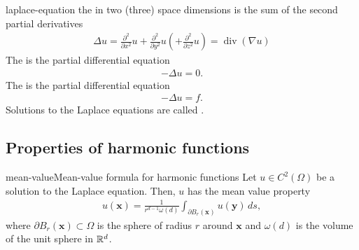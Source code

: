 \begin{Definition}{laplace-equation}
  the  in two (three) space dimensions is the sum of
  the second partial derivatives
  \begin{gather}
    \label{eq:fd:10}
    \Delta u = \frac{\partial^2}{\partial x^2}u
    + \frac{\partial^2}{\partial y^2}u
    \left(+ \frac{\partial^2}{\partial z^2}u\right)
    = \operatorname{div}(\nabla u)
  \end{gather}
  The  is the partial differential equation
  \begin{gather}
    \label{eq:fd:11}
    -\Delta u = 0.
  \end{gather}
  The  is the partial differential equation
  \begin{gather}
    \label{eq:fd:9}
    -\Delta u = f.
  \end{gather}
  Solutions to the Laplace equations are called .
\end{Definition}

\subsection{Properties of harmonic functions}

\begin{Theorem*}{mean-value}{Mean-value formula for harmonic functions}
  Let $u\in C^2(\Omega)$ be a solution to the Laplace equation. Then,
  $u$ has the mean value property
  \begin{gather}
    \label{eq:mean-value:1}
    u(\mathbf x) = \frac1{r^{d-1}\omega(d)}
    \int_{\partial B_r(\mathbf x)} u(\mathbf y) \,ds,
  \end{gather}
  where $\partial B_r(\mathbf x) \subset \Omega$ is the sphere of
  radius $r$ around $\mathbf x$ and $\omega(d)$ is the volume of the
  unit sphere in $\mathbb R^d$.
\end{Theorem*}

